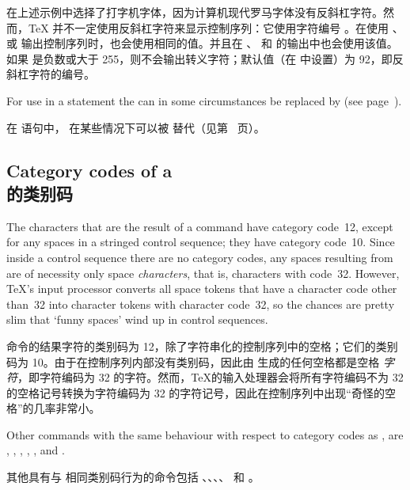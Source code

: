 在上述示例中选择了打字机字体，因为计算机现代罗马字体没有反斜杠字符。然而，\TeX{} 并不一定使用反斜杠字符来显示控制序列：它使用字符编号 。在使用 、 或  输出控制序列时，也会使用相同的值。并且在 、 和  的输出中也会使用该值。如果  是负数或大于 255，则不会输出转义字符；默认值（在 \IniTeX 中设置）为 92，即反斜杠字符的编号。

For use in a   statement the  can 
in some circumstances be
replaced  by  (see page~\pageref{expand:write}).

在  语句中， 在某些情况下可以被  替代（见第~\pageref{expand:write} 页）。


\subsection{Category codes of a \\ 的类别码}

The characters that are the result of a  command have 
category code~12, except for any spaces in 
a stringed control sequence;
they have category code~10. Since inside a control
sequence there are no category codes, 
any spaces resulting from  are
of necessity only space {\em characters}, that is,
characters with code~32.
However, \TeX's input processor converts
all space tokens that have a character code other than~32
into character tokens with character code~32, 
so the chances are pretty slim that
`funny spaces' wind up in control sequences.

 命令的结果字符的类别码为 12，除了字符串化的控制序列中的空格；它们的类别码为 10。由于在控制序列内部没有类别码，因此由  生成的任何空格都是空格 {\em 字符}，即字符编码为 32 的字符。然而，\TeX 的输入处理器会将所有字符编码不为 32 的空格记号转换为字符编码为 32 的字符记号，因此在控制序列中出现“奇怪的空格”的几率非常小。


Other commands with the same behaviour with respect to 
category codes as , are
,
, , , ,
and .

其他具有与  相同类别码行为的命令包括 、、、、 和 。

